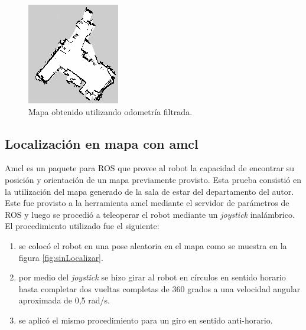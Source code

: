 \begin{figure}[ht]
    \centering
    \includegraphics[scale=1.2]{./Figures/mapa_lindo.png}
    \caption{Mapa obtenido utilizando odometría filtrada.}
    \label{fig:mapaLindo}
\end{figure}



\subsection{Localización en mapa con amcl}

Amcl es un paquete para ROS que provee al robot la capacidad de encontrar su posición y orientación de un mapa previamente provisto. Esta prueba consistió en la utilización del mapa generado de la sala de estar del departamento del autor. Este fue provisto a la herramienta amcl mediante el servidor de parámetros de ROS y luego se procedió a teleoperar el robot mediante un \textit{joystick} inalámbrico. El procedimiento utilizado fue el siguiente:

\begin{enumerate}
    \item se colocó el robot en una pose aleatoria en el mapa como se muestra en la figura \ref{fig:sinLocalizar}.
    \item por medio del \textit{joystick} se hizo girar al robot en círculos en sentido horario hasta completar dos vueltas completas de 360 grados a una velocidad angular aproximada de 0,5 rad/s.
    \item se aplicó el mismo procedimiento para un giro en sentido anti-horario.
\end{enumerate}



